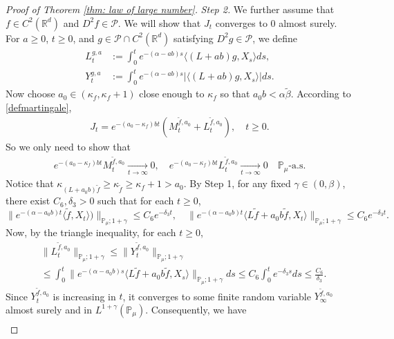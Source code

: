 \documentclass[12pt,a4paper]{amsart}
\theoremstyle{plain}
\theoremstyle{definition}
\numberwithin{equation}{section}
\begin{document}
\begin{proof}[Proof of Theorem \ref{thm: law of large number}]
\emph{Step 2.}
We further assume that $f\in C^2(\mathbb R^d)$ and $D^2f \in \mathcal{P}$.
We will show that $J_t$ converges to $0$ almost surely.
For $a \geq 0$, $ t\geq 0$, and $g\in \mathcal{P}\cap C^2(\mathbb{R}^d)$ satisfying $D^2g\in \mathcal{P}$, we define
\begin{align}
	L_t^{g,a}
  & :=\int_0^t e^{-(\alpha-ab)s}\langle (L+ab)g,X_s\rangle ds,\\
  Y_t^{g,a}
  & :=\int_0^t e^{-(\alpha-ab)s}|\langle (L+ab)g,X_s\rangle|ds.
\end{align}
Now choose $a_0 \in (\kappa_{f}, \kappa_f + 1)$ close enough to $\kappa_f$ so that $a_0 b < \alpha \tilde \beta$.
According to \eqref{defmartingale}, 
\begin{align}
  J_t
  = e^{-(a_0-\kappa_f)bt} (M_t^{\widetilde{f}, a_0}+L_t^{\widetilde{f}, a_0}),
  \quad t\geq 0.
\end{align}
So we only need to show that
\begin{align}
  e^{-(a_0-\kappa_f)b t}M_t^{\widetilde{f},a_0}
  \xrightarrow[t\to \infty]{} 0,
  \quad e^{-(a_0-\kappa_f)b t}L_t^{\widetilde{f},a_0}
  \xrightarrow[t\to \infty]{} 0
  \quad \mathbb{P}_{\mu}\text{-a.s.}
\end{align}
Notice that $\kappa_{(L+a_0 b)\widetilde{f}}\geq \kappa_{\widetilde{f}}\geq \kappa_f+1 > a_0$.
By Step 1, for any fixed $\gamma\in (0,\beta)$, there exist $C_6, \delta_3>0$ such that for each $t\geq 0$,
\begin{equation}
  \| e^{-(\alpha-a_0 b)t}\langle \widetilde{f},X_t\rangle)\|_{\mathbb{P}_{\mu};1+\gamma}
  \leq C_6 e^{-\delta_3 t},
  \quad \|e^{-(\alpha-a_0 b)t}\langle L\widetilde{f}+a_0 b\widetilde{f},X_t\rangle\|_{\mathbb{P}_{\mu};1+\gamma}
  \leq C_6 e^{-\delta_3 t}.
\end{equation}
Now, by the triangle inequality, for each $t\geq 0$,
\begin{align}
  & \|L_t^{\widetilde{f},a_0}\|_{\mathbb{P}_{\mu};1+\gamma}
    \leq\|Y_t^{\widetilde{f},a_0}\|_{\mathbb{P}_{\mu};1+\gamma} \\
  & \leq \int_0^t \|e^{-(\alpha-a_0 b)s}\langle L\widetilde{f}+a_0 b\widetilde{f},X_s\rangle\|_{\mathbb{P}_{\mu};1+\gamma}ds\leq C_6 \int_0^t e^{-\delta_3 s}ds\leq\frac{C_6}{\delta_3}.
\end{align}
Since $Y_t^{\widetilde{f},a_0}$ is increasing in $t$, it converges to some finite random variable $Y_{\infty}^{\widetilde{f},a_0}$ almost surely and in $L^{1+\gamma}(\mathbb{P}_{\mu})$.
Consequently,  we have
\begin{align}

\end{align}
\end{proof}
\end{document}
